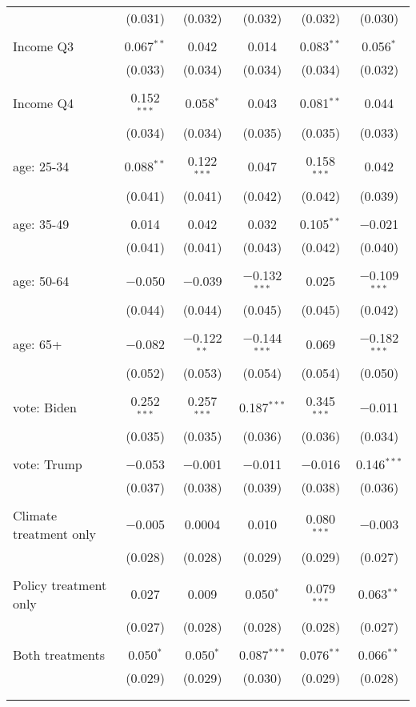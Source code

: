 \begin{tabular}{@{\extracolsep{5pt}}lccccc}
  & (0.031) & (0.032) & (0.032) & (0.032) & (0.030) \\ 
  & & & & & \\ 
 Income Q3 & 0.067$^{**}$ & 0.042 & 0.014 & 0.083$^{**}$ & 0.056$^{*}$ \\ 
  & (0.033) & (0.034) & (0.034) & (0.034) & (0.032) \\ 
  & & & & & \\ 
 Income Q4 & 0.152$^{***}$ & 0.058$^{*}$ & 0.043 & 0.081$^{**}$ & 0.044 \\ 
  & (0.034) & (0.034) & (0.035) & (0.035) & (0.033) \\ 
  & & & & & \\ 
 age: 25-34 & 0.088$^{**}$ & 0.122$^{***}$ & 0.047 & 0.158$^{***}$ & 0.042 \\ 
  & (0.041) & (0.041) & (0.042) & (0.042) & (0.039) \\ 
  & & & & & \\ 
 age: 35-49 & 0.014 & 0.042 & 0.032 & 0.105$^{**}$ & $-$0.021 \\ 
  & (0.041) & (0.041) & (0.043) & (0.042) & (0.040) \\ 
  & & & & & \\ 
 age: 50-64 & $-$0.050 & $-$0.039 & $-$0.132$^{***}$ & 0.025 & $-$0.109$^{***}$ \\ 
  & (0.044) & (0.044) & (0.045) & (0.045) & (0.042) \\ 
  & & & & & \\ 
 age: 65+ & $-$0.082 & $-$0.122$^{**}$ & $-$0.144$^{***}$ & 0.069 & $-$0.182$^{***}$ \\ 
  & (0.052) & (0.053) & (0.054) & (0.054) & (0.050) \\ 
  & & & & & \\ 
 vote: Biden & 0.252$^{***}$ & 0.257$^{***}$ & 0.187$^{***}$ & 0.345$^{***}$ & $-$0.011 \\ 
  & (0.035) & (0.035) & (0.036) & (0.036) & (0.034) \\ 
  & & & & & \\ 
 vote: Trump & $-$0.053 & $-$0.001 & $-$0.011 & $-$0.016 & 0.146$^{***}$ \\ 
  & (0.037) & (0.038) & (0.039) & (0.038) & (0.036) \\ 
  & & & & & \\ 
 Climate treatment only & $-$0.005 & 0.0004 & 0.010 & 0.080$^{***}$ & $-$0.003 \\ 
  & (0.028) & (0.028) & (0.029) & (0.029) & (0.027) \\ 
  & & & & & \\ 
 Policy treatment only & 0.027 & 0.009 & 0.050$^{*}$ & 0.079$^{***}$ & 0.063$^{**}$ \\ 
  & (0.027) & (0.028) & (0.028) & (0.028) & (0.027) \\ 
  & & & & & \\ 
 Both treatments & 0.050$^{*}$ & 0.050$^{*}$ & 0.087$^{***}$ & 0.076$^{**}$ & 0.066$^{**}$ \\ 
  & (0.029) & (0.029) & (0.030) & (0.029) & (0.028) \\ 
  & & & & & \\ 
\hline \\[-1.8ex] 


\end{tabular}
